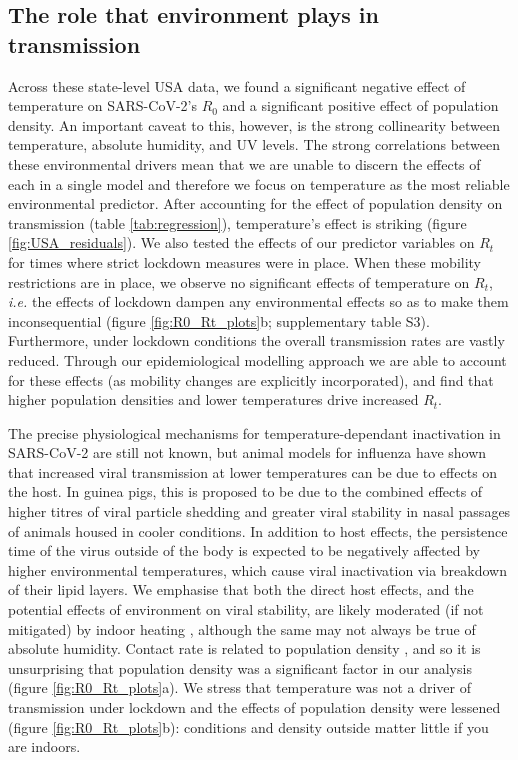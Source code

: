 \documentclass[12pt,english,a4paper]{article}
\newcommand{\virus}{SARS-CoV-2\xspace}
\newcommand{\RO}{$R_0$\xspace}
\begin{document}
\subsection*{The role that environment plays in transmission}

Across these state-level USA data, we found a significant negative effect of temperature on \virus's \RO and a significant positive effect of population density. An important caveat to this, however, is the strong collinearity between temperature, absolute humidity, and UV levels. The strong correlations between these environmental drivers mean that we are unable to discern the effects of each in a single model and therefore we focus on temperature as the most reliable environmental predictor. After accounting for the effect of population density on transmission (table \ref{tab:regression}), temperature's effect is  striking (figure \ref{fig:USA_residuals}). 
We also tested the effects of our predictor variables on $R_t$ for times where strict lockdown measures were in place. When these mobility restrictions are in place, we observe no significant effects of temperature on $R_t$, \emph{i.e.} the effects of lockdown dampen any environmental effects so as to make them inconsequential (figure \ref{fig:R0_Rt_plots}b; supplementary table S3). Furthermore, under lockdown conditions the overall transmission rates are vastly reduced. 
Through our epidemiological modelling approach we are able to account for these effects (as mobility changes are explicitly incorporated), and find that higher population densities and lower temperatures drive increased $R_t$.

The precise physiological mechanisms for temperature-dependant inactivation in \virus are still not known, but animal models for influenza have shown that increased viral transmission at lower temperatures can be due to effects on the host\cite{Lowen2007, Lowen2014}. In guinea pigs, this is proposed to be due to the combined effects of higher titres of viral particle shedding and greater viral stability in nasal passages of animals housed in cooler conditions\cite{Lowen2014}. 
In addition to host effects, the persistence time of the virus outside of the body is expected to be negatively affected by higher environmental temperatures, which cause viral inactivation via breakdown of their lipid layers\citep{Chan2011,Schoeman2019}. 
We emphasise that both the direct host effects, and the potential effects of environment on viral stability, are likely moderated (if not mitigated) by indoor heating \cite{Shaman2010}, although the same may not always be true of absolute humidity.
Contact rate is related to population density \cite{Rocklov2020}, and so it is unsurprising that population density was a significant factor in our analysis (figure \ref{fig:R0_Rt_plots}a).
We stress that temperature was not a driver of transmission under lockdown and the effects of population density were lessened (figure \ref{fig:R0_Rt_plots}b): conditions and density outside matter little if you are indoors.
\end{document}
